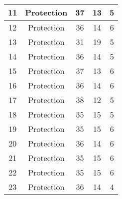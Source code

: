 \documentclass[results.tex]{subfiles}
\begin{document}
\begin{center}
\begin{tabular}{| c || c | c | c | c |}
            \hline
            11                      & Protection                   & 37                     & 13                      & 5                    \\
            \hline
            12                      & Protection                   & 36                     & 14                      & 6                    \\
            \hline
            13                      & Protection                   & 31                     & 19                      & 5                    \\
            \hline
            14                      & Protection                   & 36                     & 14                      & 5                    \\
            \hline
            15                      & Protection                   & 37                     & 13                      & 6                    \\
            \hline
            16                      & Protection                   & 36                     & 14                      & 6                    \\
            \hline
            17                      & Protection                   & 38                     & 12                      & 5                    \\
            \hline
            18                      & Protection                   & 35                     & 15                      & 5                    \\
            \hline
            19                      & Protection                   & 35                     & 15                      & 6                    \\
            \hline
            20                      & Protection                   & 36                     & 14                      & 6                    \\
            \hline
            21                      & Protection                   & 35                     & 15                      & 6                    \\
            \hline
            22                      & Protection                   & 35                     & 15                      & 6                    \\
            \hline
            23                      & Protection                   & 36                     & 14                      & 4                    \\

\end{tabular}
\end{center}
\end{document}
